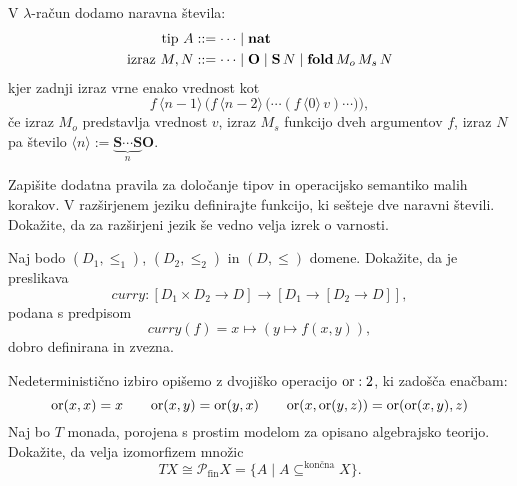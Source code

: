 \documentclass[arhiv]{../izpit}
\begin{document}

\naloga[\tocke{20}]
\newcommand{\zro}{\mathbf{O}}
\newcommand{\suc}[1]{\mathbf{S} \, #1}
\newcommand{\fold}[3]{\mathbf{fold} \, #1 \, #2 \, #3}
\newcommand{\intsym}[1]{\langle #1 \rangle}
V $\lambda$-račun dodamo naravna števila:
\begin{align*}
  \text{tip } A &\bnfis \cdots \mid
    \natty \\
  \text{izraz } M, N &\bnfis \cdots \mid
    \zro \mid
    \suc{N} \mid
    \fold{M_o}{M_s}{N}
\end{align*}
kjer zadnji izraz vrne enako vrednost kot
\[
  f \, \intsym{n - 1} \, \bigg(f \, \intsym{n - 2} \, \big(\cdots (f \, \intsym{0} \, v) \cdots\big)\bigg),
\]
če izraz $M_o$ predstavlja vrednost $v$, izraz $M_s$ funkcijo dveh argumentov $f$, izraz $N$ pa število $\intsym{n} := \underbrace{\mathbf{S} \cdots \mathbf{S}}_n \mathbf{O}$.

\podnaloga Zapišite dodatna pravila za določanje tipov in operacijsko semantiko malih korakov.
\podnaloga V razširjenem jeziku definirajte funkcijo, ki sešteje dve naravni števili.
\podnaloga Dokažite, da za razširjeni jezik še vedno velja izrek o varnosti.

\nadaljevanje


\naloga[\tocke{15}]

Naj bodo $(D_1, \leq_1)$, $(D_2, \leq_2)$ in $(D, \leq)$ domene. Dokažite, da je preslikava
\[
  \mathit{curry} : [D_1 \times D_2 \to D] \to [D_1 \to [D_2 \to D]],
\]
podana s predpisom
\[
  \mathit{curry}(f) = x \mapsto (y \mapsto f(x, y)),
\]
dobro definirana in zvezna.

\nadaljevanje


\naloga[\tocke{20}]
\newcommand{\bind}{\mathop{>\!\!\!>\!\!\!=}}

Nedeterministično izbiro opišemo z dvojiško operacijo $\mathrm{or} : 2$, ki zadošča enačbam:
\[
  \mathrm{or}(x, x) = x \qquad \mathrm{or}(x, y) = \mathrm{or}(y, x) \qquad \mathrm{or}(x, \mathrm{or}(y, z)) = \mathrm{or}(\mathrm{or}(x, y), z)
\]
Naj bo $T$ monada, porojena s prostim modelom za opisano algebrajsko teorijo. Dokažite, da velja izomorfizem množic
\[
  T X \cong \mathcal{P}_{\text{fin}} X = \{ A \mid A \subseteq^{\text{končna}} X \}.
\]

\nadaljevanje
\end{document}
